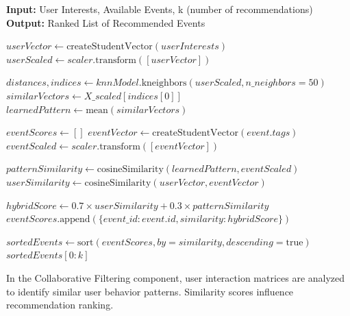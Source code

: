 \begin{algorithm}[H]
\caption{Hybrid KNN Event Recommendation}
\label{alg:hybrid_recommendation}
\textbf{Input:} User Interests, Available Events, k (number of recommendations)\\
\textbf{Output:} Ranked List of Recommended Events
\begin{algorithmic}[1]
    \State $userVector \gets \text{createStudentVector}(userInterests)$
    \State $userScaled \gets scaler.\text{transform}([userVector])$
    
    \State $distances, indices \gets knnModel.\text{kneighbors}(userScaled, n\_neighbors=50)$
    \State $similarVectors \gets X\_scaled[indices[0]]$
    \State $learnedPattern \gets \text{mean}(similarVectors)$
    
    \State $eventScores \gets []$
        \State $eventVector \gets \text{createStudentVector}(event.tags)$
        \State $eventScaled \gets scaler.\text{transform}([eventVector])$
        
        \State $patternSimilarity \gets \text{cosineSimilarity}(learnedPattern, eventScaled)$
        \State $userSimilarity \gets \text{cosineSimilarity}(userVector, eventVector)$
        
        \State $hybridScore \gets 0.7 \times userSimilarity + 0.3 \times patternSimilarity$
        \State $eventScores.\text{append}(\{event\_id: event.id, similarity: hybridScore\})$
    \EndFor
    
    \State $sortedEvents \gets \text{sort}(eventScores, by=similarity, descending=\text{true})$
    \State \Return $sortedEvents[0:k]$
\EndFunction
\end{algorithmic}
\end{algorithm}

In the Collaborative Filtering component, user interaction matrices are analyzed to identify similar user behavior patterns. Similarity scores influence recommendation ranking.


